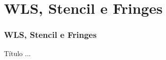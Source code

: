 \documentclass[../main/main.tex]{subfiles}
\begin{document}
	
\section{WLS, Stencil e  Fringes}



\begin{frame}
	\frametitle{WLS, Stencil e  Fringes}
\end{frame}



\begin{frame}{Título}
	...
\end{frame}
\end{document}
